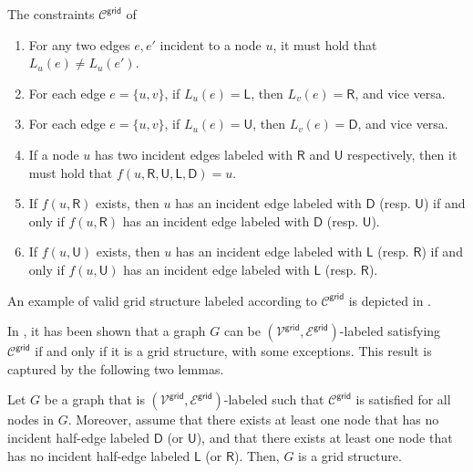 \documentclass[11pt]{article}
\newcommand{\lleft}{\mathsf {L}}
\newcommand{\lright}{\mathsf {R}}
\newcommand{\lup}{\mathsf {U}}
\newcommand{\ldown}{\mathsf {D}}
\newcommand{\lgrid}{\mathsf {grid}}
\begin{document}
\begin{myframe}{The constraints $\mathcal{C}^{\lgrid}$ of \cite{congest-lcls}}
\begin{enumerate}
	\item For any two edges $e,e'$ incident to a node $u$, it must hold that $L_u(e)\neq L_u(e')$.\label{cons-grid:differentEdgeLabels}
	
	\item For each edge $e=\{u,v\}$, if $L_u(e)=\lleft$, then $L_v(e)=\lright$, and vice versa. \label{cons-grid:left-right}
	
	\item For each edge $e=\{u,v\}$, if $L_u(e)=\lup$, then $L_v(e)=\ldown$, and vice versa.\label{cons-grid:up-down}
	
	\item If a node $u$ has two incident edges labeled with $\lright$ and $\lup$ respectively, then it must hold that $f(u, \lright,\lup,\lleft,\ldown)=u$. \label{cons-grid:square}
	
	\item If $f(u,\lright)$ exists, then
	$u$ has an incident edge labeled with $\ldown$ (resp. $\lup$) if and only if  $f(u,\lright)$ has an incident edge labeled with $\ldown$ (resp. $\lup$). \label{cons-grid:down-propagates}
	
	\item If $f(u,\lup)$ exists, then
	$u$ has an incident edge labeled with $\lleft$ (resp. $\lright$) if and only if  $f(u,\lup)$ has an incident edge labeled with $\lleft$  (resp. $\lright$). \label{cons-grid:left-propagates}
\end{enumerate}
\end{myframe}
\noindent An example of valid grid structure labeled according to $\mathcal{C}^{\lgrid}$ is depicted in .

In \cite{congest-lcls}, it has been shown that a graph $G$ can be $(\mathcal{V^\lgrid},\mathcal{E^\lgrid})$-labeled satisfying $\mathcal{C}^{\lgrid}$ if and only if it is a grid structure, with some exceptions. This result is captured by the following two lemmas.
\begin{lemma}\label{lem:grid}
	Let $G$ be a graph that is $(\mathcal{V^\lgrid},\mathcal{E^\lgrid})$-labeled such that $\mathcal{C}^{\lgrid}$ is satisfied for all nodes in $G$. Moreover, assume that there exists at least one node that has no incident half-edge labeled $\ldown$ (or $\lup$), and that there exists at least one node that has no incident half-edge labeled $\lleft$ (or $\lright$). Then, $G$ is a grid structure.
\end{lemma}
\end{document}
